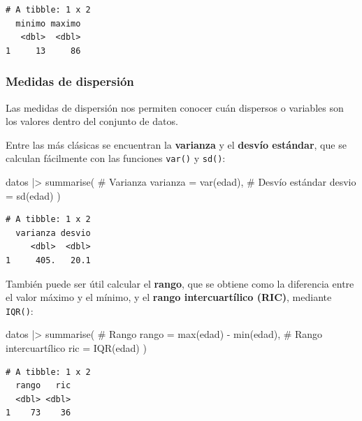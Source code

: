 \documentclass[
  spanish,
  a4paper,
]{scrbook}
\newenvironment{Shaded}{\begin{snugshade}}{\end{snugshade}}
\newcommand{\AttributeTok}[1]{\textcolor[rgb]{0.40,0.45,0.13}{#1}}
\newcommand{\CommentTok}[1]{\textcolor[rgb]{0.37,0.37,0.37}{#1}}
\newcommand{\FunctionTok}[1]{\textcolor[rgb]{0.28,0.35,0.67}{#1}}
\newcommand{\NormalTok}[1]{\textcolor[rgb]{0.00,0.23,0.31}{#1}}
\newcommand{\SpecialCharTok}[1]{\textcolor[rgb]{0.37,0.37,0.37}{#1}}
\begin{document}
\begin{verbatim}
# A tibble: 1 x 2
  minimo maximo
   <dbl>  <dbl>
1     13     86
\end{verbatim}

\subsubsection{Medidas de dispersión}\label{medidas-de-dispersiuxf3n}

Las medidas de dispersión nos permiten conocer cuán dispersos o
variables son los valores dentro del conjunto de datos.

Entre las más clásicas se encuentran la \textbf{varianza} y el
\textbf{desvío estándar}, que se calculan fácilmente con las funciones
\texttt{var()} y \texttt{sd()}:

\begin{Shaded}
\begin{Highlighting}[]
\NormalTok{datos }\SpecialCharTok{|\textgreater{}}
  \FunctionTok{summarise}\NormalTok{(}
    \CommentTok{\# Varianza}
    \AttributeTok{varianza =} \FunctionTok{var}\NormalTok{(edad),}
    \CommentTok{\# Desvío estándar}
    \AttributeTok{desvio =} \FunctionTok{sd}\NormalTok{(edad)}
\NormalTok{  )}
\end{Highlighting}
\end{Shaded}

\begin{verbatim}
# A tibble: 1 x 2
  varianza desvio
     <dbl>  <dbl>
1     405.   20.1
\end{verbatim}

También puede ser útil calcular el \textbf{rango}, que se obtiene como
la diferencia entre el valor máximo y el mínimo, y el \textbf{rango
intercuartílico (RIC)}, mediante \texttt{IQR()}:

\begin{Shaded}
\begin{Highlighting}[]
\NormalTok{datos }\SpecialCharTok{|\textgreater{}}
  \FunctionTok{summarise}\NormalTok{(}
    \CommentTok{\# Rango}
    \AttributeTok{rango =} \FunctionTok{max}\NormalTok{(edad) }\SpecialCharTok{{-}} \FunctionTok{min}\NormalTok{(edad),}
    \CommentTok{\# Rango intercuartílico}
    \AttributeTok{ric =} \FunctionTok{IQR}\NormalTok{(edad)}
\NormalTok{  )}
\end{Highlighting}
\end{Shaded}

\begin{verbatim}
# A tibble: 1 x 2
  rango   ric
  <dbl> <dbl>
1    73    36
\end{verbatim}
\end{document}
